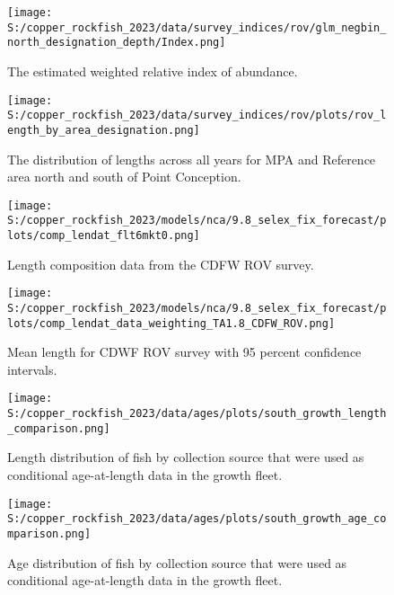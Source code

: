 \documentclass[11pt,
  english,
  letterpaper,
]{article}
\begin{document}
\pagebreak

\begin{figure}
\centering
\texttt{[image: S:/copper\_rockfish\_2023/data/survey\_indices/rov/glm\_negbin\_north\_designation\_depth/Index.png]}
\caption{The estimated weighted relative index of abundance.\label{fig:rov-index-main}}
\end{figure}

\pagebreak

\begin{figure}
\centering
\texttt{[image: S:/copper\_rockfish\_2023/data/survey\_indices/rov/plots/rov\_length\_by\_area\_designation.png]}
\caption{The distribution of lengths across all years for MPA and Reference area north and south of Point Conception.\label{fig:rov-len}}
\end{figure}

\pagebreak

\begin{figure}
\centering
\texttt{[image: S:/copper\_rockfish\_2023/models/nca/9.8\_selex\_fix\_forecast/plots/comp\_lendat\_flt6mkt0.png]}
\caption{Length composition data from the CDFW ROV survey.\label{fig:rov-len-data}}
\end{figure}

\pagebreak

\begin{figure}
\centering
\texttt{[image: S:/copper\_rockfish\_2023/models/nca/9.8\_selex\_fix\_forecast/plots/comp\_lendat\_data\_weighting\_TA1.8\_CDFW\_ROV.png]}
\caption{Mean length for CDWF ROV survey with 95 percent confidence intervals.\label{fig:mean-rov-len-data}}
\end{figure}

\pagebreak

\begin{figure}
\centering
\texttt{[image: S:/copper\_rockfish\_2023/data/ages/plots/south\_growth\_length\_comparison.png]}
\caption{Length distribution of fish by collection source that were used as conditional age-at-length data in the growth fleet.\label{fig:growth-len-dist}}
\end{figure}

\pagebreak

\begin{figure}
\centering
\texttt{[image: S:/copper\_rockfish\_2023/data/ages/plots/south\_growth\_age\_comparison.png]}
\caption{Age distribution of fish by collection source that were used as conditional age-at-length data in the growth fleet.\label{fig:growth-age-dist}}
\end{figure}
\end{document}
